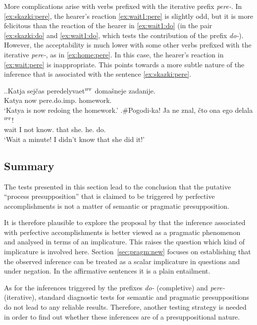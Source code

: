 More complications arise with verbs prefixed with the iterative prefix \textit{pere-}. In \ref{ex:skazki:pere}, the hearer's reaction \ref{ex:wait1:pere} is slightly odd, but it is more felicitous than the reaction of the hearer in \ref{ex:wait1:do} (in the pair \ref{ex:skazki:do} and \ref{ex:wait1:do}, which tests the contribution of the prefix \textit{do-}). However, the acceptability is much lower with some other verbs prefixed with the iterative \textit{pere-}, as in \ref{ex:home:pere}. In this case, the hearer's reaction in \ref{ex:wait:pere} is inappropriate. This points towards a more subtle nature of the inference that is associated with the sentence \ref{ex:skazki:pere}.

\ex.\ag.\label{ex:home:pere}Katja sej\v{c}as peredelyvaet$^{\textsc{ipf}}$ {doma\v{s}neje zadanije}.\\
Katya now pere.do.imp. homework.\\
\trans `Katya is now redoing the homework.'
\bg.\#Pogodi-ka! Ja ne znal, \v{c}to ona ego delala$^{\textsc{ipf}}$!\label{ex:wait:pere}\\
wait I not know. that she. he. do.\\
\trans `Wait a minute! I didn't know that she did it!'

\subsection{Summary}
The tests presented in this section lead to the conclusion that the putative ``process presupposition'' that is claimed to be triggered by perfective accomplishments is not a matter of semantic or pragmatic presupposition.

It is therefore plausible to explore the proposal by \citet{Gronn:04, Gronn:06} that the inference associated with perfective accomplishments is better viewed as a pragmatic phenomenon and analysed in terms of an implicature.
This raises the question which kind of implicature is involved here. Section~\ref{sec:pragm:new} focuses on establishing that the observed inference can be treated as a scalar implicature in questions and under negation. In the affirmative sentences it is a plain entailment.

As for the inferences triggered by the prefixes \textit{do-} (completive) and \textit{pere-} (iterative), standard diagnostic tests for semantic and pragmatic presuppositions do not lead to any reliable results. Therefore, another testing strategy is needed in order to find out whether these inferences are of a presuppositional nature. 

